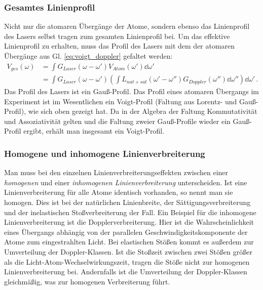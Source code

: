 \subsubsection{Gesamtes Linienprofil}\label{subsubsec:ges-linienprofil}
Nicht nur die atomaren Übergänge der Atome, sondern ebenso das Linienprofil
des Lasers selbst tragen zum gesamten Linienprofil bei. Um das effektive
Linienprofil zu erhalten, muss das Profil des Lasers mit dem der atomaren
Übergänge aus Gl. \eqref{eq:voigt_doppler} gefaltet werden:
\begin{equation}\label{eq:voigt}
	\begin{split}
		V_{ges}(\omega)
		&=\int{G_{Laser}(\omega-\omega')V_{Atom}(\omega')\dd\omega'}\\
		&=\int{G_{Laser}(\omega-\omega')\left(\int{L_{nat+sat}(\omega'-\omega'')G_{Doppler}(\omega'')\dd\omega''}\right)\dd\omega'}\,.
	\end{split}
\end{equation}
Das Profil des Lasers ist ein Gauß-Profil. Das Profil eines atomaren Übergangs
im Experiment ist im Wesentlichen ein Voigt-Profil (Faltung aus Lorentz- und
Gauß-Profil), wie sich oben gezeigt hat. Da in der Algebra der Faltung
Kommutativität und Assoziativität gelten und die Faltung zweier Gauß-Profile
wieder ein Gauß-Profil ergibt, erhält man insgesamt ein Voigt-Profil.

\subsubsection{Homogene und inhomogene
Linienverbreiterung}\label{subsubsec:homogene_inhomogene_verbreiterung}
Man muss bei den einzelnen Linienverbreiterungseffekten zwischen einer
\textit{homogenen} und einer \textit{inhomogenen Linienverbreiterung}
unterscheiden. Ist eine Linienverbreiterung für alle Atome identisch vorhanden,
so nennt man sie homogen. Dies ist bei der natürlichen Linienbreite, der
Sättigungsverbreiterung und der inelastischen Stoßverbreiterung der Fall. Ein
Beispiel für die inhomogene Linienverbreiterung ist die Dopplerverbreiterung.
Hier ist die Wahrscheinlichkeit eines Übergangs abhängig von der parallelen
Geschwindigkeitskomponente der Atome zum eingestrahlten Licht. Bei elastischen
Stößen kommt es außerdem zur Umverteilung der Doppler-Klassen. Ist die Stoßzeit
zwischen zwei Stößen größer als die Licht-Atom-Wechselwirkungszeit, tragen die
Stöße nicht zur homogenen Linienverbreiterung bei. Andernfalls ist die
Umverteilung der Doppler-Klassen gleichmäßig, was zur homogenen Verbreiterung
führt. 

